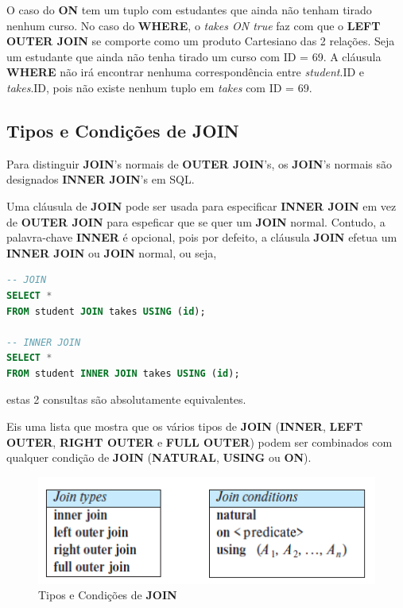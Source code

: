 \documentclass[oneside]{book}
\theoremstyle{definition}
\begin{document}
O caso do \textbf{ON} tem um tuplo com estudantes que ainda não tenham tirado nenhum curso. No caso do \textbf{WHERE}, o \textit{takes ON true} faz com que o \textbf{LEFT OUTER JOIN} se comporte como um produto Cartesiano das 2 relações. Seja um estudante que ainda não tenha tirado um curso com ID = 69. A cláusula \textbf{WHERE} não irá encontrar nenhuma correspondência entre \textit{student}.ID e \textit{takes}.ID, pois não existe nenhum tuplo em \textit{takes} com ID = 69.

\subsection{Tipos e Condições de JOIN}
Para distinguir \textbf{JOIN}'s normais de \textbf{OUTER JOIN}'s, os \textbf{JOIN}'s normais são designados \textbf{INNER JOIN}'s em SQL.

Uma cláusula de \textbf{JOIN} pode ser usada para especificar \textbf{INNER JOIN} em vez de \textbf{OUTER JOIN} para espeficar que se quer um \textbf{JOIN} normal. Contudo, a palavra-chave \textbf{INNER} é opcional, pois por defeito, a cláusula \textbf{JOIN} efetua um \textbf{INNER JOIN} ou \textbf{JOIN} normal, ou seja,

\begin{lstlisting}[language=SQL, morekeywords={REFERENCES, REFRESH, MATERIALIZED, CONCURRENTLY}, framesep=8pt, xleftmargin=40pt, framexleftmargin=40pt, frame=tb, framerule=0pt]
-- JOIN
SELECT *
FROM student JOIN takes USING (id);

-- INNER JOIN
SELECT *
FROM student INNER JOIN takes USING (id);
\end{lstlisting}
estas 2 consultas são absolutamente equivalentes.

Eis uma lista que mostra que os vários tipos de \textbf{JOIN} (\textbf{INNER}, \textbf{LEFT OUTER}, \textbf{RIGHT OUTER} e \textbf{FULL OUTER}) podem ser combinados com qualquer condição de \textbf{JOIN} (\textbf{NATURAL}, \textbf{USING} ou \textbf{ON}).

\begin{figure}[H]
    \centering
    \includegraphics[scale = 0.5]{cap2/join_tipos_conds.png}
    \caption{Tipos e Condições de \textbf{JOIN}}
\end{figure}
\end{document}
